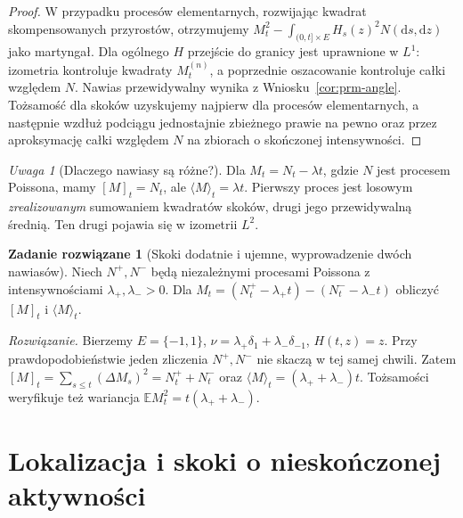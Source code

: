 \documentclass[11pt,a4paper,oneside]{report}
\numberwithin{equation}{chapter}
\theoremstyle{plain}
\theoremstyle{definition}
\newtheorem{zadanie}{Zadanie rozwiązane}[chapter]
\theoremstyle{remark}
\newtheorem{uwaga}{Uwaga}[chapter]
\newcommand{\E}{\mathbb{E}}
\newcommand{\dd}{\mathrm{d}}
\begin{document}
\begin{proof}
W przypadku procesów elementarnych, rozwijając kwadrat
skompensowanych przyrostów, otrzymujemy
$M_t^2-\int_{(0,t]\times E}H_s(z)^2N(\dd s,\dd z)$
jako martyngał. Dla ogólnego $H$ przejście do granicy jest
uprawnione w $L^1$: izometria kontroluje kwadraty $M_t^{(n)}$,
a poprzednie oszacowanie kontroluje całki względem $N$.
Nawias przewidywalny wynika z Wniosku~\ref{cor:prm-angle}.
Tożsamość dla skoków uzyskujemy najpierw dla procesów
elementarnych, a następnie wzdłuż podciągu jednostajnie
zbieżnego prawie na pewno oraz przez aproksymację całki
względem $N$ na zbiorach o skończonej intensywności.
\end{proof}

\begin{uwaga}[Dlaczego nawiasy są różne?]
Dla $M_t=N_t-\lambda t$, gdzie $N$ jest procesem
Poissona, mamy $[M]_t=N_t$, ale
$\langle M\rangle_t=\lambda t$. Pierwszy proces
jest losowym \emph{zrealizowanym} sumowaniem kwadratów
skoków, drugi jego przewidywalną średnią.
Ten drugi pojawia się w izometrii $L^2$.
\end{uwaga}

\begin{zadanie}[Skoki dodatnie i ujemne, wyprowadzenie dwóch nawiasów]
Niech $N^+,N^-$ będą niezależnymi procesami Poissona z
intensywnościami $\lambda_+,\lambda_->0$. Dla
$M_t=(N_t^+-\lambda_+t)-(N_t^--\lambda_-t)$ obliczyć
$[M]_t$ i $\langle M\rangle_t$.

\emph{Rozwiązanie.} Bierzemy $E=\{-1,1\}$,
$\nu=\lambda_+\delta_1+\lambda_-\delta_{-1}$,
$H(t,z)=z$. Przy prawdopodobieństwie jeden zliczenia
$N^+,N^-$ nie skaczą w tej samej chwili. Zatem
$[M]_t=\sum_{s\le t}(\Delta M_s)^2=N_t^++N_t^-$ oraz
$\langle M\rangle_t=(\lambda_++\lambda_-)t$.
Tożsamości weryfikuje też wariancja
$\E M_t^2=t(\lambda_++\lambda_-)$.
\end{zadanie}

\section{Lokalizacja i skoki o nieskończonej aktywności}
\end{document}
